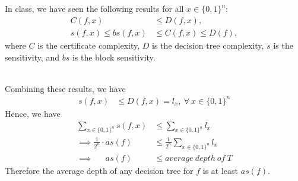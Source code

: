\documentclass{article}
\begin{document}
\subsection{}
In class, we have seen the following results for all $x \in \{0, 1\}^n$:
\begin{align}
	C(f, x) &\leq D(f, x), \\
	s(f, x) \leq bs(f, x) &\leq C(f, x) \leq D(f),
\end{align}
where $C$ is the certificate complexity, $D$ is the decision tree complexity, $s$ is the sensitivity, and $bs$ is the block sensitivity.

\,\\
\noindent
Combining these results, we have
\begin{align}
	s(f, x) &\leq D(f, x) = l_x, \ \forall \ x \in \{0, 1\}^n
\end{align}
Hence, we have
\begin{align*}
	\sum_{x \in \{0, 1\}^n} s(f, x) &\leq \sum_{x \in \{0, 1\}^n} l_x \\
	\implies \frac{1}{2^n} \cdot as(f) &\leq \frac{1}{2^n} \sum_{x \in \{0, 1\}^n} l_x \\
	\implies\quad\ \  as(f) &\leq average\ depth\ of\ T
\end{align*}
Therefore the average depth of any decision tree for $f$ is at least $as(f)$.
\vspace*{-2mm}\begin{flushright}\qedsymbol{}\end{flushright}
\end{document}
